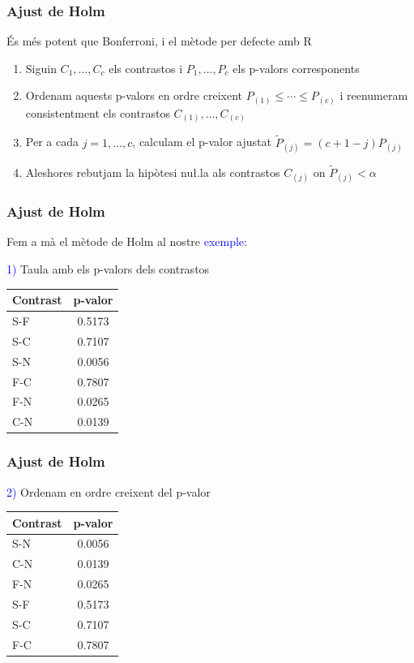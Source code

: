 \documentclass[12pt,t]{beamer}
\newcommand{\blue}[1]{\textcolor{blue}{#1}}
\renewcommand{\emph}[1]{{\color{red}#1}}
\renewcommand{\leq}{\leqslant}
\theoremstyle{plain}
\theoremstyle{definition}
\begin{document}
\begin{frame}
\frametitle{Ajust de Holm}


És més potent que Bonferroni, i el mètode per defecte amb R\medskip

\begin{enumerate}
\item Siguin $C_{1},\ldots ,C_{c}$ els contrastos i $P_{1},\ldots ,P_{c}$ els p-valors corresponents
\medskip

\item Ordenam aquests p-valors en ordre creixent $P_{(1)}\leq \cdots\leq P_{(c)}$ i reenumeram consistentment els contrastos $C_{(1)},\ldots, C_{(c)}$
\medskip

\item Per a cada $j=1,\ldots,c$, calculam el \emph{p-valor ajustat} $\widetilde{P}_{(j)}=(c+1-j)P_{(j)}$
\medskip

\item Aleshores rebutjam la hipòtesi nu\l.la als contrastos $C_{(j)}$ on $\widetilde{P}_{(j)}<\alpha$
 \end{enumerate}


\end{frame}



\begin{frame}
\frametitle{Ajust de Holm}


Fem a mà el mètode de Holm al nostre \blue{exemple}:\medskip

\blue{1)} Taula amb els p-valors dels contrastos

\begin{center}
\begin{tabular}{l|c}
Contrast & p-valor \\ \hline
S-F & 0.5173\\
S-C & 0.7107\\
S-N & 0.0056\\
F-C &0.7807\\
F-N & 0.0265\\
C-N & 0.0139
\end{tabular}
\end{center}

\end{frame}


\begin{frame}
\frametitle{Ajust de Holm}


\blue{2)} Ordenam en ordre creixent del p-valor

\begin{center}
\begin{tabular}{l|c}
Contrast & p-valor \\ \hline
S-N & 0.0056\\
C-N & 0.0139\\
F-N & 0.0265\\
S-F & 0.5173\\
S-C & 0.7107\\
F-C &0.7807\\
\end{tabular}
\end{center}

\end{frame}
\end{document}
